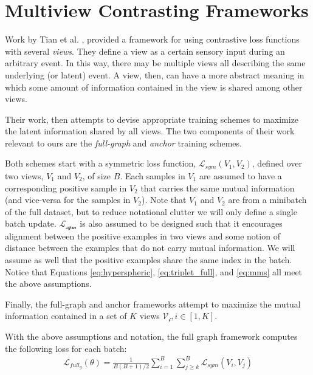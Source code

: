 \section{Multiview Contrasting Frameworks}
\label{section:multiview_framework}
Work by Tian et al. \cite{tian2020contrastive}, provided a framework for using contrastive loss functions with several \textit{views}.
They define a view as a certain sensory input during an arbitrary event.  
In this way, there may be multiple views all describing the same underlying (or latent) event.
A view, then, can have a more abstract meaning in which some amount of information contained in the view is shared among other views.

Their work, then attempts to devise appropriate training schemes to maximize the latent information shared by all views.
The two components of their work relevant to ours are the \textit{full-graph} and \textit{anchor} training schemes.

Both schemes start with a symmetric loss function, $\mathcal{L}_{sym}(V_1,V_2)$, defined over two views, $V_1$ and $V_2$, of size $B$.
Each samples in $V_1$ are assumed to have a corresponding positive sample in $V_2$ that carries the same mutual information (and vice-versa for the samples in $V_2$).
Note that $V_1$ and $V_2$ are from a minibatch of the full dataset, but to reduce notational clutter we will only define a single batch update.
$\mathcal{L_{sym}}$ is also assumed to be designed such that it encourages alignment between the positive examples in two views and some notion of distance between the examples that do not carry mutual information.
We will assume as well that the positive examples share the same index in the batch. 
Notice that Equations \ref{eq:hyperspheric}, \ref{eq:triplet_full}, and \ref{eq:mms} all meet the above assumptions.

Finally, the full-graph and anchor frameworks attempt to maximize the mutual information contained in a set of $K$ views $\mathcal{V_i}, i\in [1,K]$.

With the above assumptions and notation, the full graph framework computes the following loss for each batch:
\begin{align*}
    \mathcal{L}_{full_g}(\theta) = \frac{1}{B(B+1)/2}\sum_{i=1}^B \sum_{j\geq k}^B \mathcal{L}_{sym}(V_i, V_j)
\end{align*}

